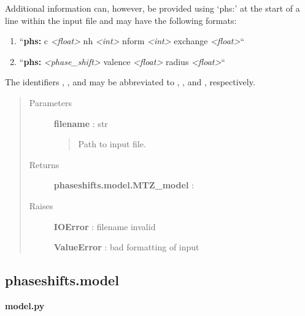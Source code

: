 \documentclass[letterpaper,10pt,english]{sphinxmanual}
\begin{document}
\begin{fulllineitems}
\begin{fulllineitems}
\begin{description}
\end{description}

Additional information can, however, be provided using `phs:' at the 
start of a line within the input file and may have the following 
formats:
\begin{enumerate}
\item {} 
``\textbf{phs:} c \emph{\textless{}float\textgreater{}} nh \emph{\textless{}int\textgreater{}} nform \emph{\textless{}int\textgreater{}} exchange \emph{\textless{}float\textgreater{}}``

\item {} 
``\textbf{phs:} \emph{\textless{}phase\_shift\textgreater{}} valence \emph{\textless{}float\textgreater{}} radius \emph{\textless{}float\textgreater{}}``

\end{enumerate}

The identifiers , ,  and  may 
be abbreviated to , ,  and , respectively.
\begin{quote}\begin{description}
\item[{Parameters}] \leavevmode
\textbf{filename} : str
\begin{quote}

Path to input file.
\end{quote}

\item[{Returns}] \leavevmode
\textbf{phaseshifts.model.MTZ\_model} :

\item[{Raises}] \leavevmode
\textbf{IOError} : filename invalid

\textbf{ValueError} : bad formatting of input

\end{description}\end{quote}

\end{fulllineitems}


\end{fulllineitems}



\subsection{phaseshifts.model}
\label{modules:module-phaseshifts.model}\label{modules:phaseshifts-model}
\textbf{model.py}
\end{document}
